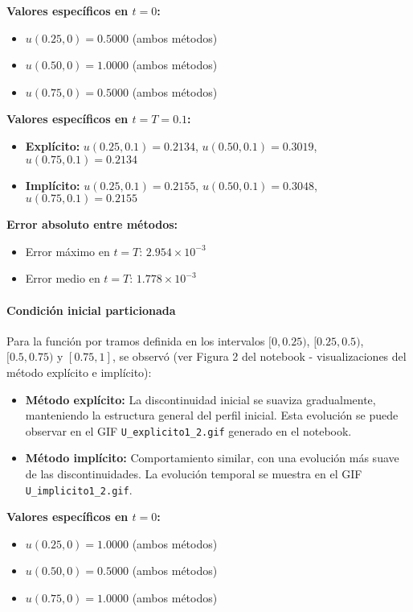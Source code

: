 \documentclass[12pt,a4paper]{article}
\begin{document}
\textbf{Valores específicos en $t = 0$:}
\begin{itemize}
    \item $u(0.25, 0) = 0.5000$ (ambos métodos)
    \item $u(0.50, 0) = 1.0000$ (ambos métodos) 
    \item $u(0.75, 0) = 0.5000$ (ambos métodos)
\end{itemize}

\textbf{Valores específicos en $t = T = 0.1$:}
\begin{itemize}
    \item \textbf{Explícito:} $u(0.25, 0.1) = 0.2134$, $u(0.50, 0.1) = 0.3019$, $u(0.75, 0.1) = 0.2134$
    \item \textbf{Implícito:} $u(0.25, 0.1) = 0.2155$, $u(0.50, 0.1) = 0.3048$, $u(0.75, 0.1) = 0.2155$
\end{itemize}

\textbf{Error absoluto entre métodos:}
\begin{itemize}
    \item Error máximo en $t = T$: $2.954 \times 10^{-3}$
    \item Error medio en $t = T$: $1.778 \times 10^{-3}$
\end{itemize}

\paragraph{Condición inicial particionada}

Para la función por tramos definida en los intervalos $[0, 0.25)$, $[0.25, 0.5)$, $[0.5, 0.75)$ y $[0.75, 1]$, se observó (ver Figura 2 del notebook - visualizaciones del método explícito e implícito):

\begin{itemize}
    \item \textbf{Método explícito:} La discontinuidad inicial se suaviza gradualmente, manteniendo la estructura general del perfil inicial. Esta evolución se puede observar en el GIF \texttt{U\_explicito1\_2.gif} generado en el notebook.
    \item \textbf{Método implícito:} Comportamiento similar, con una evolución más suave de las discontinuidades. La evolución temporal se muestra en el GIF \texttt{U\_implicito1\_2.gif}.
\end{itemize}

\textbf{Valores específicos en $t = 0$:}
\begin{itemize}
    \item $u(0.25, 0) = 1.0000$ (ambos métodos)
    \item $u(0.50, 0) = 0.5000$ (ambos métodos)
    \item $u(0.75, 0) = 1.0000$ (ambos métodos)
\end{itemize}
\end{document}
